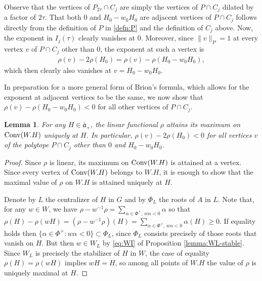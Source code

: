 \documentclass[12pt]{amsart}
\newtheorem{lemma}[theorem]{Lemma}
\theoremstyle{remark}
\newcommand{\ga}{\mathfrak a}
\begin{document}
Observe that the vertices of $P_{2 \tau} \cap C_j$ are simply the vertices of $P \cap C_j$ dilated by a factor of $2 \tau$. That both $0$ and $H_0 -w_0H_0$ are adjacent vertices of $P \cap C_j$ follows directly from the definition of $P$ in \eqref{defn:P} and the definition of $C_j$ above. Now, the exponent in $I_j(\tau)$ clearly vanishes at $0$. Moreover, since $\|v\|_P = 1$ at every vertex $v$ of $P \cap C_j$ other than $0$, the exponent at such a vertex is
\begin{gather*}
\rho(v) - 2 \rho(H_0)=\rho( v) -  \rho( H_0 -w_0H_0),
\end{gather*}
which then clearly also vanishes at $v=H_0-w_0H_0$.

In preparation for a more general form of Brion's formula, which allows for the exponent at adjacent vertices to be the same, we now show that $\rho(v) -  \rho(H_0 -w_0H_0)< 0$ for all other vertices of $P \cap C_j$. 

\begin{lemma}\label{prop_max_rho}
For any $H \in \bar{\ga}_+$, the linear functional $\rho$ attains its maximum on $\textnormal{Conv}(W.H)$ uniquely at $H$. In particular, $\rho(v) - 2\rho(H_0)<0$ for all vertices $v$ of the polytope $P \cap C_j$ other than $0$ and $H_0-w_0H_0$.
\end{lemma}
\begin{proof}
Since $\rho$ is linear, its maximum on $\textnormal{Conv}(W.H)$ is attained at a vertex. Since every vertex of $\textnormal{Conv}(W.H)$ belongs to $W.H$, it is enough to show that the maximal value of $\rho$ on $W.H$ is attained uniquely at $H$.

Denote by $L$ the centralizer of $H$ in $G$ and by $\Phi_L$ the roots of $A$ in $L$. Note that, for any $w\in W$, we have $\rho-w^{-1}\rho = \sum_{\alpha\in \Phi^+,\, w\alpha<0}\alpha$ so that $\rho(H)-\rho(wH)= (\rho-w^{-1}\rho)(H) = \sum_{\alpha\in \Phi^+,\, w\alpha<0} \alpha(H)\ge0$. If equality holds then $\{\alpha\in \Phi^+:w\alpha<0\}\subset\Phi_L$, since $\Phi_L$ consists precisely of those roots that vanish on $H$. But then $w\in W_L$ by \eqref{eq:WI} of Proposition \ref{lemma:WL-stable}. Since $W_L$ is precisely the stabilizer of $H$ in $W$, the case of equality $\rho(H)=\rho(wH)$ implies $wH=H$, so among all points of $W.H$ the value of $\rho$ is uniquely maximal at $H$.
%
\end{proof}
\end{document}
